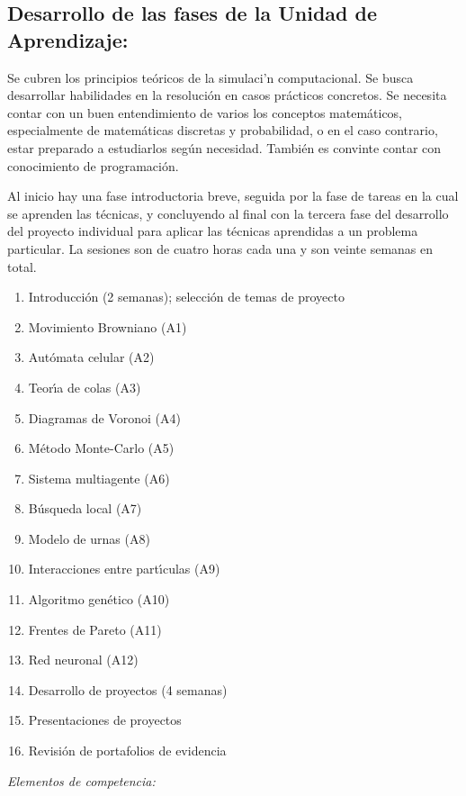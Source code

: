 \documentclass[10 pt]{article}
\begin{document}
\subsection{Desarrollo de las fases de la Unidad de Aprendizaje:}

Se cubren los principios te\'{o}ricos de la simulaci'n
computacional. Se busca desarrollar habilidades en la resoluci\'{o}n
en casos pr\'{a}cticos concretos. Se necesita contar con un buen
entendimiento de varios los conceptos matem\'{a}ticos, especialmente
de matem\'{a}ticas discretas y probabilidad, o en el caso contrario,
estar preparado a estudiarlos seg\'{u}n necesidad. Tambi\'{e}n es
convinte contar con conocimiento de programaci\'{o}n.

Al inicio hay una fase introductoria breve, seguida por la fase de
tareas en la cual se aprenden las t\'{e}cnicas, y concluyendo al final con
la tercera fase del desarrollo del proyecto individual para aplicar
las t\'{e}cnicas aprendidas a un problema particular. La sesiones son de cuatro horas cada una y son veinte
semanas en total.
\begin{enumerate}[itemsep=-3pt]
\item{Introducci\'{o}n (2 semanas); selecci\'{o}n de temas de proyecto}
\item{Movimiento Browniano (A1)}
\item{Aut\'{o}mata celular (A2)}
\item{Teor\'{\i}a de colas (A3)}
\item{Diagramas de Voronoi (A4)}
\item{M\'{e}todo Monte-Carlo (A5)}
\item{Sistema multiagente (A6)}
\item{B\'{u}squeda local (A7)}
\item{Modelo de urnas (A8)}
\item{Interacciones entre part\'{\i}culas (A9)}
\item{Algoritmo gen\'{e}tico (A10)}
\item{Frentes de Pareto (A11)}
\item{Red neuronal (A12)}
\item{Desarrollo de proyectos (4 semanas)}  
\item{Presentaciones de proyectos}
\item{Revisi\'{o}n de portafolios de evidencia}
\end{enumerate}

{\em Elementos de competencia:}
\end{document}
